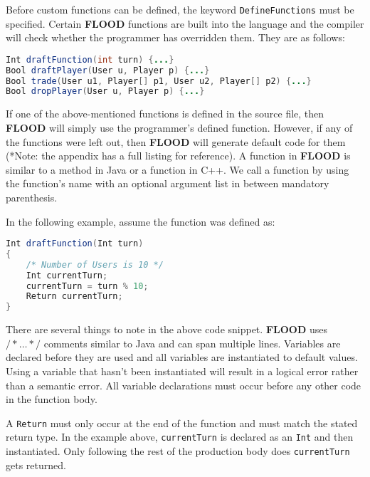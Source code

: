 \documentclass[12pt]{report}
\begin{document}
Before custom functions can be defined, the keyword \texttt{DefineFunctions} must be specified. Certain \textbf{FLOOD} functions are built into the language and the compiler will check whether the programmer has overridden them. They are as follows:

\begin{singlespace}
\begin{lstlisting}[language=Java,label=some-code,caption=Predefined FLOOD functions]
Int draftFunction(int turn) {...}
Bool draftPlayer(User u, Player p) {...}
Bool trade(User u1, Player[] p1, User u2, Player[] p2) {...}
Bool dropPlayer(User u, Player p) {...}
\end{lstlisting}
\end{singlespace}

If one of the above-mentioned functions is defined in the source file, then \textbf{FLOOD} will simply use the programmer's defined function. However, if any of the functions were left out, then \textbf{FLOOD} will generate default code for them (*Note: the appendix has a full listing for reference). A function in \textbf{FLOOD} is similar to a method in Java or a function in C++. We call a function by using the function's name with an optional argument list in between mandatory parenthesis.

In the following example, assume the function was defined as:

\begin{singlespace}
\begin{lstlisting}[language=Java,label=some-code,caption=Predefined FLOOD functions]
Int draftFunction(Int turn)
{
	/* Number of Users is 10 */
	Int currentTurn;
	currentTurn = turn % 10;
	Return currentTurn;
}
\end{lstlisting}
\end{singlespace}

There are several things to note in the above code snippet. \textbf{FLOOD} uses $/*\ldots*/$ comments similar to Java and can span multiple lines. Variables are declared before they are used and all variables are instantiated to default values. Using a variable that hasn't been instantiated will result in a logical error rather than a semantic error. All variable declarations must occur before any other code in the function body. 

A \texttt{Return} must only occur at the end of the function and must match the stated return type. In the example above, \texttt{currentTurn} is declared as an \texttt{Int} and then instantiated. Only following the rest of the production body does \texttt{currentTurn} gets returned.
\end{document}
